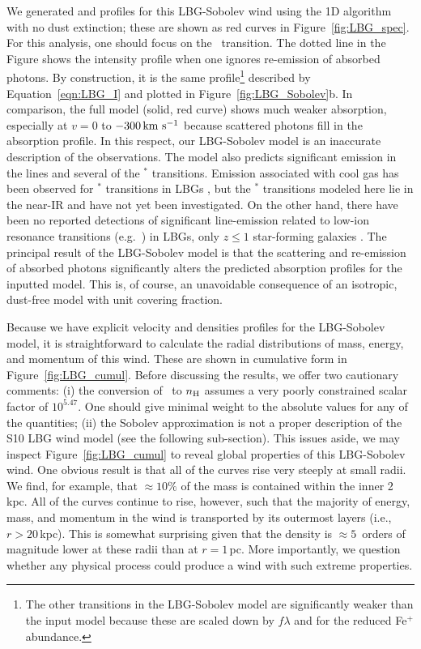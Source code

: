 \documentclass[12pt,preprint]{aastex}
\begin{document}
We generated  and  profiles for this LBG-Sobolev
wind
using the 1D algorithm with no dust extinction; these are shown as
red curves in Figure~\ref{fig:LBG_spec}.   For this analysis, one
should focus on the \mgiia\ transition.  The dotted line in the Figure
shows the intensity profile when one ignores re-emission
of absorbed photons.  By construction, it is the same profile\footnote{
  The other transitions in
  the LBG-Sobolev model are significantly weaker than the input model
  because these are scaled down by $f\lambda$ and 
  for  the reduced Fe$^+$ abundance.} 
described by Equation~\ref{eqn:LBG_I} and plotted in
Figure~\ref{fig:LBG_Sobolev}b.   In comparison, the full model (solid,
red curve)
shows much weaker absorption, especially at $v = 0$ to $-300 \, {\rm km~s^{-1}}$
because scattered photons fill in the absorption profile.
In this respect, our LBG-Sobolev model is an
inaccurate description of the observations. The model
also predicts significant emission in the  lines and several of
the $^*$ transitions.   Emission associated with cool gas
has been observed for $^*$
transitions in LBGs \citep{prs+02,shapley03}, but
the $^*$ transitions
modeled here lie in the near-IR and have not yet been investigated.
On the other hand, there have been no 
reported detections of significant line-emission related to low-ion resonance
transitions (e.g.\ ) in LBGs, only $z \le 1$ star-forming galaxies
\citep{wcp+09,rwk+10}.  
The principal result of the LBG-Sobolev model is that the scattering and re-emission of
absorbed photons significantly alters the predicted absorption profiles
for the inputted model.  This is, of course, an unavoidable
consequence of an isotropic, dust-free model with unit covering
fraction.

Because we have explicit velocity and densities profiles for the LBG-Sobolev
model, it is straightforward to calculate the radial
distributions of mass, energy, and momentum of
this wind.  These are shown in cumulative form in
Figure~\ref{fig:LBG_cumul}.  Before discussing the results, we offer
two cautionary comments: (i) the conversion of \nmg\ to $n_{\rm H}$
assumes a very poorly constrained scalar factor of $10^{5.47}$.  One
should give minimal weight to the absolute values for any of the
quantities;
(ii) the Sobolev approximation is not a proper description of the S10
LBG wind model (see the following sub-section).
This issues aside, we may inspect Figure~\ref{fig:LBG_cumul} to reveal
global properties of this LBG-Sobolev wind.
One obvious result is that all of the curves rise very steeply at
small radii.  We find, for example, that $\approx 10\%$ of the mass is
contained within the inner 2\,kpc.  All of the curves continue to
rise, however, such that the majority of energy, mass, and momentum in
the wind is transported by its outermost layers (i.e., $r > 20$\,kpc).
This is somewhat surprising given that the density is $\approx
5$~orders of magnitude lower at these radii than at $r = 1$\,pc.
More importantly, we question whether any physical process could
produce a wind with such extreme properties. 
\end{document}
